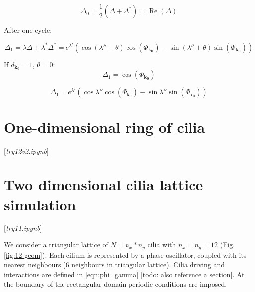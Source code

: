 \documentclass[a4paper,12pt]{article}
\renewcommand*{\Re}{\operatorname{Re}}
\renewcommand*{\vec}[1]{\mathbf{#1}}
\newcommand*{\D}{\Delta}%
\begin{document}
$$
\D_0 = \frac{1}{2} (\D + \D^*) = \Re(\D)
$$


After one cycle:


$$
\D_1 = \lambda \D + \lambda^* \D^* 
=
e^{\lambda'} 
\left(
\cos(\lambda'' +\theta) \cos(\Phi_{\mathbf{k_0}}) -  \sin( \lambda'' + \theta)   \sin(\Phi_{\mathbf{k_0}})
\right)
$$



If $d_{\vec{k}_0}=1$, $\theta=0$:
$$
\D_1 =  \cos(\Phi_{\mathbf{k_0}})
$$

$$
\D_1 = 
e^{\lambda'} 
\left(
\cos \lambda'' \cos(\Phi_{\mathbf{k_0}}) -  \sin \lambda''   \sin(\Phi_{\mathbf{k_0}})
\right)
$$

\section{One-dimensional ring of cilia}
[\textit{try12v2.ipynb}]

\clearpage
\section{Two dimensional cilia lattice simulation}

[\textit{try11.ipynb}]

We consider a triangular lattice of $N = n_x * n_y$ cilia with $n_x=n_y=12$ (Fig. \ref{fig:12-geom}). Each cilium is represented by a phase oscillator, coupled with its nearest neighbours (6 neighbours in triangular lattice). Cilia driving and interactions are defined in \eqref{eqn:phi_gamma} [todo: also reference a section]. At the boundary of the rectangular domain periodic conditions are imposed.
\end{document}
